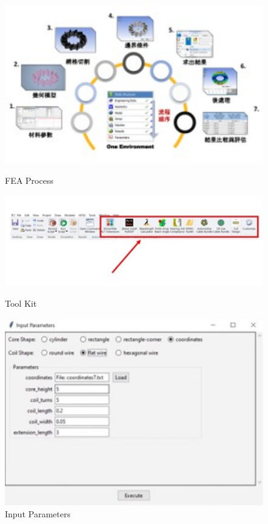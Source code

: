 \documentclass[10pt, letterpaper]{article}
\begin{document}
\begin{figure}[htbp]
        \vspace{2.0cm}

        \begin{minipage}[t]{0.33\linewidth}
            \centering
            \includegraphics[width=1.0\textwidth]{fig/Delta Electronics/FEA analysis process.jpg}
            \caption{FEA Process}
        \end{minipage}
        \begin{minipage}[t]{0.33\linewidth}
            \centering
            \includegraphics[width=1.0\textwidth]{fig/Delta Electronics/quick call bottom.jpg}
            \caption{Tool Kit}
        \end{minipage}%
        \begin{minipage}[t]{0.33\linewidth}
            \centering
            \includegraphics[width=1.0\textwidth]{fig/Delta Electronics/input parameters.jpg}
            \caption{Input Parameters}
        \end{minipage}          
    \end{figure}
\end{document}
